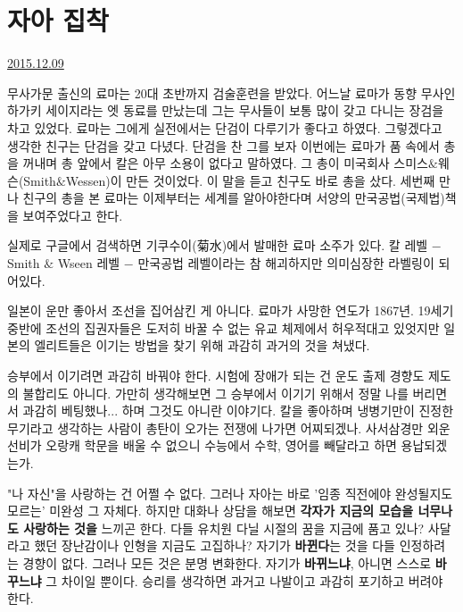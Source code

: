\section{자아 집착}
\href{https://www.kockoc.com/Apoc/536401}{2015.12.09}

\vspace{5mm}

무사가문 출신의 료마는 20대 초반까지 검술훈련을 받았다.
어느날 료마가 동향 무사인 하가키 세이지라는 엣 동료를 만났는데
그는 무사들이 보통 많이 갖고 다니는 장검을 차고 있었다.
료마는 그에게 실전에서는 단검이 다루기가 좋다고 하였다.
그렇겠다고 생각한 친구는 단검을 갖고 다녔다.
단검을 찬 그를 보자 이번에는 료마가 품 속에서 총을 꺼내며 총 앞에서 칼은 아무 소용이 없다고 말하였다.
그 총이 미국회사 스미스$\&$웨슨(Smith$\&$Wessen)이 만든 것이었다.
이 말을 듣고 친구도 바로 총을 샀다.
세번째 만나 친구의 총을 본 료마는 이제부터는 세계를 알아야한다며 서양의 만국공법(국제법)책을 보여주었다고 한다.
\vspace{5mm}

실제로 구글에서 검색하면
기쿠수이(菊水)에서 발매한 료마 소주가 있다.
칼 레벨 $-$ Smith $\&$ Wseen 레벨 $-$ 만국공법 레벨이라는 참 해괴하지만 의미심장한 라벨링이 되어있다.
\vspace{5mm}

일본이 운만 좋아서 조선을 집어삼킨 게 아니다.
료마가 사망한 연도가 1867년.
19세기 중반에 조선의 집권자들은 도저히 바꿀 수 없는 유교 체제에서 허우적대고 있엇지만
일본의 엘리트들은 이기는 방법을 찾기 위해 과감히 과거의 것을 쳐냈다.
\vspace{5mm}

승부에서 이기려면 과감히 바꿔야 한다.
시험에 장애가 되는 건 운도 출제 경향도 제도의 불합리도 아니다.
가만히 생각해보면 그 승부에서 이기기 위해서 정말 나를 버리면서 과감히 베팅했나... 하며 그것도 아니란 이야기다.
칼을 좋아하며 냉병기만이 진정한 무기라고 생각하는 사람이 총탄이 오가는 전쟁에 나가면 어찌되겠나.
사서삼경만 외운 선비가 오랑캐 학문을 배울 수 없으니 수능에서 수학, 영어를 빼달라고 하면 용납되겠는가.
\vspace{5mm}

"나 자신"을 사랑하는 건 어쩔 수 없다. 그러나 자아는 바로 '임종 직전에야 완성될지도 모르는' 미완성 그 자체다.
하지만 대화나 상담을 해보면 \textbf{각자가 지금의 모습을 너무나도 사랑하는 것을} 느끼곤 한다.
다들 유치원 다닐 시절의 꿈을 지금에 품고 있나? 사달라고 했던 장난감이나 인형을 지금도 고집하나?
자기가 \textbf{바뀐다}는 것을 다들 인정하려는 경향이 없다.
그러나 모든 것은 분명 변화한다. 자기가 \textbf{바뀌느냐}, 아니면 스스로 \textbf{바꾸느냐} 그 차이일 뿐이다.
승리를 생각하면 과거고 나발이고 과감히 포기하고 버려야 한다.
\vspace{5mm}

